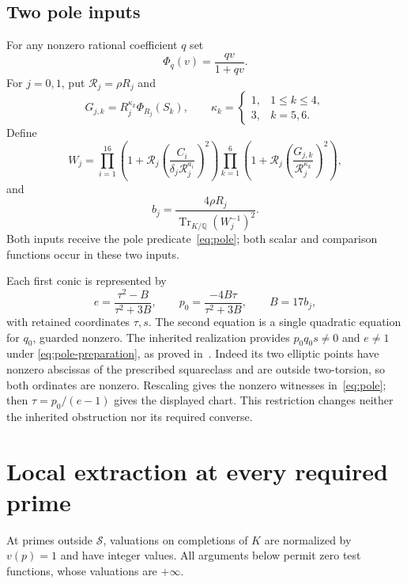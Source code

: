 \documentclass[11pt,a4paper]{article}
\newcommand{\Q}{\mathbb Q}\newcommand{\Z}{\mathbb Z}
\DeclareMathOperator{\Tr}{Tr}
\begin{document}
\subsection{Two pole inputs}

For any nonzero rational coefficient $q$ set
\[
                     \Phi_q(v)=\frac{qv}{1+qv}.
\]
For $j=0,1$, put $\mathcal R_j=\rho R_j$ and
\begin{equation}\label{eq:normalized-functions}
 G_{j,k}=R_j^{\kappa_k}\Phi_{R_j}(S_k),\qquad
 \kappa_k=\begin{cases}1,&1\le k\le4,\\3,&k=5,6.\end{cases}
\end{equation}
Define
\begin{equation}\label{eq:W}
 W_j=
 \prod_{i=1}^{16}\left(1+\mathcal R_j
        \left(\frac{C_i}{\delta_j\mathcal R_j^{a_i}}\right)^2\right)
 \prod_{k=1}^{6}\left(1+\mathcal R_j
        \left(\frac{G_{j,k}}{\mathcal R_j^{\kappa_k}}\right)^2\right),
\end{equation}
and
\begin{equation}\label{eq:pole-inputs}
 b_j=\frac{4\rho R_j}{\Tr_{K/\Q}(W_j^{-1})^2}.
\end{equation}
Both inputs receive the pole predicate~\eqref{eq:pole}; both
scalar and comparison functions occur in these two inputs.

Each first conic is represented by
\[
 e=\frac{\tau^2-B}{\tau^2+3B},\qquad
 p_0=\frac{-4B\tau}{\tau^2+3B},\qquad B=17b_j,
\]
with retained coordinates $\tau,s$. The second equation is a
single quadratic equation for $q_0$, guarded nonzero. The inherited
realization provides $p_0q_0s\ne0$ and $e\ne1$ under
\eqref{eq:pole-preparation}, as proved in~\cite{PointSource}.
Indeed its two elliptic points have nonzero abscissas of the prescribed
squareclass and are outside two-torsion, so both ordinates are
nonzero. Rescaling gives the nonzero witnesses in~\eqref{eq:pole};
then $\tau=p_0/(e-1)$ gives the displayed chart. This restriction
changes neither the inherited obstruction nor its required converse.

\section{Local extraction at every required prime}

At primes outside $\mathcal S$, valuations on completions of $K$
are normalized by $v(p)=1$ and have integer values. All arguments
below permit zero test functions, whose valuations are $+\infty$.
\end{document}
